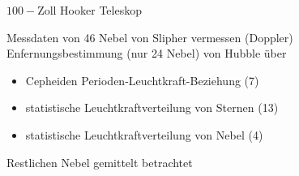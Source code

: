 \documentclass[10pt, dvipsnames]{beamer}
\begin{document}
	\begin{frame}{\( 100- \)Zoll Hooker Teleskop}
	\end{frame}
	
	\begin{frame}{Messdaten}
		 von 46 Nebel von Slipher vermessen (Doppler) \cite{slipher1915spectrographic} \\[2ex]
		{\color{MyOrange}Enfernungsbestimmung} (nur 24 Nebel) von Hubble über
		\begin{itemize}[label={\textendash}, itemindent=0.5cm]
			\item Cepheiden Perioden-Leuchtkraft-Beziehung (7)
			\item statistische Leuchtkraftverteilung von Sternen (13)
			\item statistische Leuchtkraftverteilung von Nebel (4)
		\end{itemize}
		
		Restlichen Nebel gemittelt betrachtet
	\end{frame}
	
\end{document}
